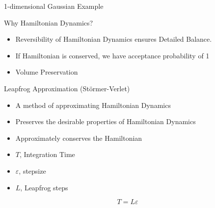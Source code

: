 \documentclass{beamer}
\begin{document}
\begin{frame}{1-dimensional Gaussian Example}
\begin{figure}
\centering
{}
\end{figure}
\end{frame}


\begin{frame}{Why Hamiltonian Dynamics?}
\begin{itemize}
\item Reversibility of Hamiltonian Dynamics ensures Detailed Balance. \vskip 5mm

\item If Hamiltonian is conserved, we have acceptance probability of 1 \vskip 5mm

\item Volume Preservation \vskip 5mm
\end{itemize}
\end{frame}


\begin{frame}{Leapfrog Approximation (Störmer-Verlet)}

\begin{itemize}
\item A method of approximating Hamiltonian Dynamics \vskip 5mm

\item Preserves the desirable properties of Hamiltonian Dynamics \vskip 5mm

\item Approximately conserves the Hamiltonian \vskip 5mm

\item $T$, Integration Time \vskip 5mm 

\item $\varepsilon$, stepsize \vskip 5mm

\item $L$, Leapfrog steps \vskip 5mm
\end{itemize}

\begin{equation}
T = L \varepsilon 
\end{equation}

\end{frame}

\end{document}
